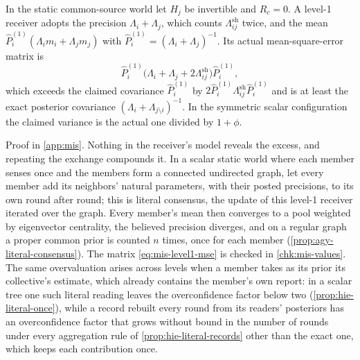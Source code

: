 \begin{proposition}\label{prop:mis-level1-mse}
In the static common-source world let $H_j$ be invertible and $R_c=0$. A level-1 receiver adopts the precision $\Lambda_i+\Lambda_j$, which counts $\Lambda^{\mathrm{sh}}_{ij}$ twice, and the mean $\hat P^{(1)}_i(\Lambda_im_i+\Lambda_jm_j)$ with $\hat P^{(1)}_i=(\Lambda_i+\Lambda_j)^{-1}$. Its actual mean-square-error matrix is
\begin{equation}\label{eq:mis-level1-mse}
\hat P^{(1)}_i\bigl(\Lambda_i+\Lambda_j+2\Lambda^{\mathrm{sh}}_{ij}\bigr)\hat P^{(1)}_i,
\end{equation}
which exceeds the claimed covariance $\hat P^{(1)}_i$ by $2\hat P^{(1)}_i\Lambda^{\mathrm{sh}}_{ij}\hat P^{(1)}_i$ and is at least the exact posterior covariance $(\Lambda_i+\Lambda_{j\setminus i})^{-1}$. In the symmetric scalar configuration the claimed variance is the actual one divided by $1+\phi$.
\end{proposition}

Proof in \cref{app:mis}. Nothing in the receiver's model reveals the excess, and repeating the exchange compounds it. In a scalar static world where each member senses once and the members form a connected undirected graph, let every member add its neighbors' natural parameters, with their posted precisions, to its own round after round; this is literal consensus, the update of this level-1 receiver iterated over the graph. Every member's mean then converges to a pool weighted by eigenvector centrality, the believed precision diverges, and on a regular graph a proper common prior is counted $n$ times, once for each member (\cref{prop:agy-literal-consensus}). The matrix \eqref{eq:mis-level1-mse} is checked in \cref{chk:mis-values}. The same overvaluation arises across levels when a member takes as its prior its collective's estimate, which already contains the member's own report: in a scalar tree one such literal reading leaves the overconfidence factor below two (\cref{prop:hie-literal-once}), while a record rebuilt every round from its readers' posteriors has an overconfidence factor that grows without bound in the number of rounds under every aggregation rule of \cref{prop:hie-literal-records} other than the exact one, which keeps each contribution once.

